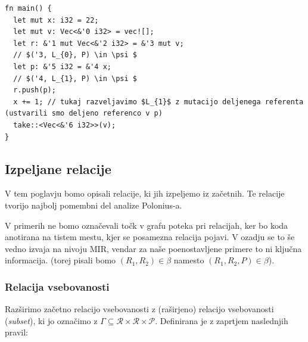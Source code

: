 \documentclass[a4paper,12pt,openright]{book}
\begin{document}
\begin{listing}[!ht]
	\begin{verbatim}
fn main() {
  let mut x: i32 = 22;
  let mut v: Vec<&'0 i32> = vec![];
  let r: &'1 mut Vec<&'2 i32> = &'3 mut v; 
  // $('3, L_{0}, P) \in \psi $
  let p: &'5 i32 = &'4 x; 
  // $('4, L_{1}, P) \in \psi $
  r.push(p);
  x += 1; // tukaj razveljavimo $L_{1}$ z mutacijo deljenega referenta (ustvarili smo deljeno referenco v p)
  take::<Vec<&'6 i32>>(v);
}
\end{verbatim}
	\caption{Primer razveljavitve posoje}
	\label{listing:loanInvalidated}
\end{listing}

\subsection{Izpeljane relacije}

V tem poglavju bomo opisali relacije, ki jih izpeljemo iz začetnih. Te relacije tvorijo najbolj pomembni del analize
Polonius-a.

V primerih ne bomo označevali točk v grafu poteka pri relacijah, ker bo koda anotirana na tistem mestu, kjer
se posamezna relacija pojavi. V ozadju se to še vedno izvaja na nivoju MIR, vendar za naše poenostavljene
primere to ni ključna informacija. (torej pisali bomo $(R_{1}, R_{2}) \in \beta$ namesto $(R_{1}, R_{2}, P) \in \beta$).

\subsubsection{Relacija vsebovanosti}

Razširimo začetno relacijo vsebovanosti z (raširjeno) relacijo vsebovanosti (\textit{subset}), ki jo označimo z
$\Gamma \subseteq \mathcal{R} \times \mathcal{R} \times \mathcal{P}$. Definirana je z zaprtjem naslednjih pravil:
\end{document}
